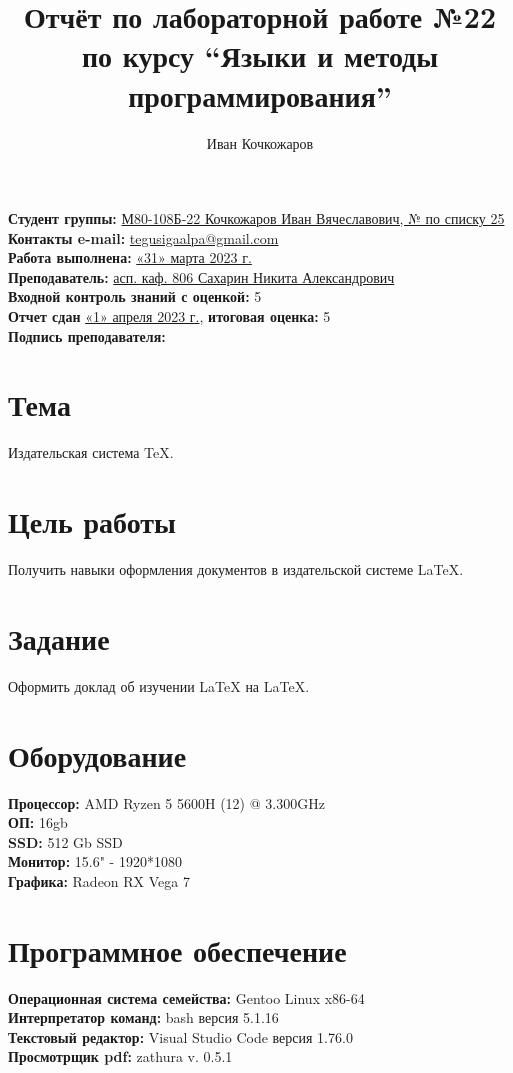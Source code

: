 \documentclass[12pt, letterpaper]{article}
\title{Отчёт по лабораторной работе №22 по курсу “Языки и методы программирования”}
\author{Иван Кочкожаров}
\begin{document}
\maketitle
\noindent \textbf{Студент группы:} \underline{М80-108Б-22 Кочкожаров Иван Вячеславович, № по списку 25}    
\\
\textbf{Контакты e-mail:} \underline{tegusigaalpa@gmail.com}
\\
\textbf{Работа выполнена:} \underline{«31» марта 2023 г.}
\\
\textbf{Преподаватель:} \underline{асп. каф. 806 Сахарин Никита Александрович}
\\
\textbf{Входной контроль знаний с оценкой:} 5
\\
\textbf{Отчет сдан} \underline{«1» апреля 2023 г.}, \textbf{итоговая оценка:} 5
\\
\textbf{Подпись преподавателя:} \underline{\hspace{3cm}}
\section{Тема}
Издательская система \TeX{}.
\section{Цель работы}
Получить навыки оформления документов в издательской системе \LaTeX{}.
\section{Задание}
Оформить доклад об изучении \LaTeX{} на \LaTeX{}.
\section{Оборудование}
\noindent \textbf{Процессор:} AMD Ryzen 5 5600H (12) @ 3.300GHz
\\
\textbf{ОП:} 16gb
\\
\textbf{SSD:} 512 Gb SSD
\\
\textbf{Монитор:} 15.6" - 1920*1080
\\
\textbf{Графика:} Radeon RX Vega 7
\section{Программное обеспечение}
\noindent \textbf{Операционная система семейства:} Gentoo Linux x86-64
\\
\textbf{Интерпретатор команд:} bash версия 5.1.16
\\
\textbf{Текстовый редактор:} Visual Studio Code версия 1.76.0
\\
\textbf{Просмотрщик pdf:} zathura v. 0.5.1
\end{document}
